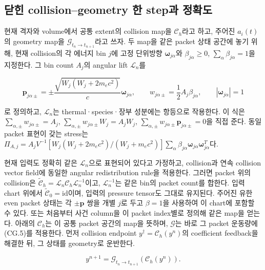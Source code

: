 \documentclass[11pt,a4paper]{article}
\begin{document}
\hypertarget{uxb2ebuxd78c-collisiongeometry-uxd55c-stepuxacfc-uxc815uxd655uxb3c4}{%
\subsection{닫힌 collision--geometry 한 step과 정확도}\label{uxb2ebuxd78c-collisiongeometry-uxd55c-stepuxacfc-uxc815uxd655uxb3c4}}

현재 격자와 volume에서 공통 extent의 collision map을 \(\mathcal C_h\)라고 하고, 주어진 \(a_i(t)\)의 geometry map을 \(\mathcal G_{t_n\to t_{n+1}}\)라고 쓰자. 두 map을 같은 packet 상태 공간에 놓기 위해, 현재 collision의 각 에너지 bin \(j\)에 고정 단위방향 \(\boldsymbol\omega_{j\alpha}\)와 \(\beta_{j\alpha}\ge0\), \(\sum_\alpha\beta_{j\alpha}=1\)을 지정한다. 그 bin count \(A_j\)의 angular lift \(\mathcal L_n\)를

\[
\boldsymbol p_{j\alpha\pm}
=\pm\frac{\sqrt{W_j(W_j+2m_ec^2)}}{c}\boldsymbol\omega_{j\alpha},
\qquad
w_{j\alpha\pm}=\frac12A_j\beta_{j\alpha},
\qquad |\boldsymbol\omega_{j\alpha}|=1
\tag{CG.L1}
\]

로 정의하고, \(\mathcal L_n\)는 thermal·species·장부 성분에는 항등으로 작용한다. 이 식은 \(\sum_{\alpha,\pm}w_{j\alpha\pm}=A_j\), \(\sum_{\alpha,\pm}w_{j\alpha\pm}W_j=A_jW_j\), \(\sum_{\alpha,\pm}w_{j\alpha\pm}\boldsymbol p_{j\alpha\pm}=0\)을 직접 준다. 동일 packet 표현이 갖는 stress는 \(\Pi_{A,j}=A_jV^{-1}[W_j(W_j+2m_ec^2)/(W_j+m_ec^2)] \sum_\alpha\beta_{j\alpha}\boldsymbol\omega_{j\alpha}\boldsymbol\omega_{j\alpha}^{T}\)다.

현재 입력도 정확히 같은 \(\mathcal L_n\)으로 표현되어 있다고 가정하고, collision과 연속 collision vector field에 동일한 angular redistribution rule을 적용한다. 그러면 packet 위의 collision은 \(\widetilde{\mathcal C}_h=\mathcal L_n\mathcal C_h\mathcal L_n^{-1}\)이고, \(\mathcal L_n^{-1}\)는 같은 bin의 packet count를 합한다. 입력 chart 위에서 \(\widetilde{\mathcal C}_0=\mathrm{id}\)이며, 입력의 pressure tensor도 그대로 유지된다. 주어진 유한 even packet 상태는 각 \(\pm\boldsymbol p\) 쌍을 개별 \(j\)로 두고 \(\beta=1\)을 사용하여 이 chart에 포함할 수 있다. 또는 처음부터 사건 column을 이 packet index별로 정의해 같은 map을 얻는다. 아래의 \(\mathcal C_h\)는 이 공통 packet 공간의 map을 뜻하며, \(\mathcal G\)는 바로 그 packet 운동량에 (CG.5)를 적용한다. 먼저 collision endpoint \(y^\dagger=\mathcal C_h(y^n)\)의 coefficient feedback을 해결한 뒤, 그 상태를 geometry로 운반한다.

\[
\boxed{
y^{n+1}
=\mathcal G_{t_n\to t_{n+1}}\!\left(\mathcal C_h(y^n)\right).
}
\tag{CG.10}
\]
\end{document}
